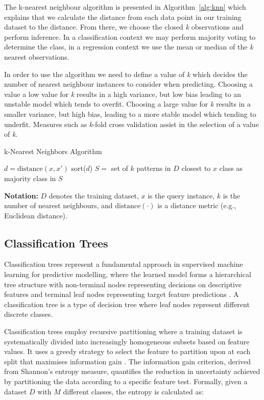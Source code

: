 \documentclass[conference]{IEEEtran}
\begin{document}
The k-nearest neighbour algorithm is presented in Algorithm~\ref{alg:knn} which explains that we calculate the distance from each data point in our training dataset to the distance. From there, we choose the closed \textit{k} observations and perform inference. In a classification context we may perform majority voting to determine the class, in a regression context we use the mean or median of the \textit{k} nearest observations.

In order to use the algorithm we need to define a value of \textit{k} which decides the number of nearest neighbour instances to consider when predicting. Choosing a value a low value for \textit{k} results in a high variance, but low bias leading to an unstable model which tends to overfit. Choosing a large value for \textit{k} results in a smaller variance, but high bias, leading to a more stable model which tending to underfit. Measures such as \textit{k}-fold cross validation assist in the selection of a value of \textit{k}.

\begin{algorithm}[htbp]
\caption{k-Nearest Neighbors Algorithm}
\label{alg:knn}
\begin{algorithmic}
\State $d = \text{distance}(x, x')$
\EndFor
\State sort($d$)
\State $S = $ set of $k$ patterns in $D$ closest to $x$
\State \Return class as majority class in $S$
\EndFunction
\end{algorithmic}
\end{algorithm}
\noindent
\textbf{Notation:} $D$ denotes the training dataset, $x$ is the query instance, $k$ is the number of nearest neighbours, and $\text{distance}(\cdot)$ is a distance metric (e.g., Euclidean distance).


\subsection{Classification Trees}
Classification trees represent a fundamental approach in supervised machine learning for predictive modelling, where the learned model forms a hierarchical tree structure with non-terminal nodes representing decisions on descriptive features and terminal leaf nodes representing target feature predictions \cite{quinlan1993c45}. A classification tree is a type of decision tree where leaf nodes represent different discrete classes.

Classification trees employ recursive partitioning where a training dataset is systematically divided into increasingly homogeneous subsets based on feature values. It uses a greedy strategy to select the feature to partition upon at each split that maximises information gain \cite{kelleher2020fundamentals}. The information gain criterion, derived from Shannon's entropy measure, quantifies the reduction in uncertainty achieved by partitioning the data according to a specific feature test.
Formally, given a dataset $D$ with $M$ different classes, the entropy is calculated as:
\end{document}
